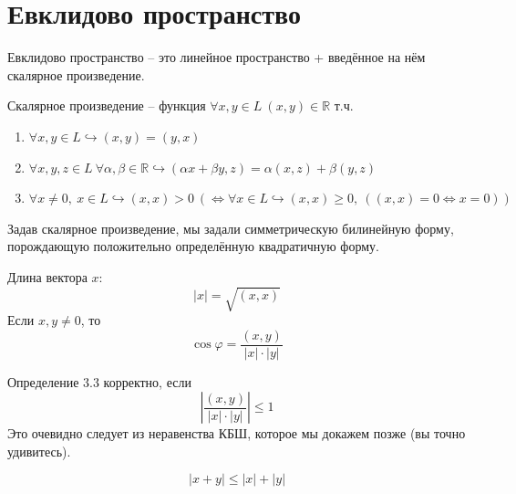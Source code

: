 \documentclass[11pt]{article}
\begin{document}
\section{Евклидово пространство}

\begin{definition}
  Евклидово пространство -- это линейное пространство + введённое на 
  нём скалярное произведение.
\end{definition}

\begin{definition}
  Скалярное произведение -- функция $\forall x, y \in L \ (x, y) \in 
  \mathbb{R}$ т.ч. 
  \begin{enumerate}
    \item $\forall x, y \in L \hookrightarrow (x, y) = (y, x)$
    \item $\forall x, y, z \in L \ \forall \alpha, \beta \in \mathbb{R} 
    \hookrightarrow (\alpha x + \beta y, z) = \alpha (x, z) + \beta 
    (y, z)$
    \item $\forall x \neq 0, \ x \in L \hookrightarrow (x, x) > 0 \ 
    (\Longleftrightarrow \forall x \in L \hookrightarrow (x, x) \geq 
    0, \ ((x, x) = 0 \Longleftrightarrow x = 0))$
  \end{enumerate}
\end{definition}

\begin{remark}
  Задав скалярное произведение, мы задали симметрическую билинейную 
  форму, порождающую положительно определённую квадратичную форму.
\end{remark}

\begin{definition}
  Длина вектора $x$: \[\left\lvert x \right\rvert = \sqrt{(x, x)}\]
  Если $x, y \neq 0$, то 
  \[\cos \varphi = \frac{(x, y)}{\left\lvert x \right\rvert \cdot
  \left\lvert y \right\rvert}\]
\end{definition}

\begin{remark}
  Определение 3.3 корректно, если \[\left\lvert \frac{(x, y)}
  {\left\lvert x \right\rvert \cdot \left\lvert y \right\rvert} 
  \right\rvert \leq 1\]
  Это очевидно следует из неравенства КБШ, которое мы докажем позже 
  (вы точно удивитесь).
\end{remark}

\begin{theorem}
  \[\left\lvert x + y \right\rvert \leq \left\lvert x \right\rvert 
  + \left\lvert y \right\rvert\] 
\end{theorem}
\end{document}
